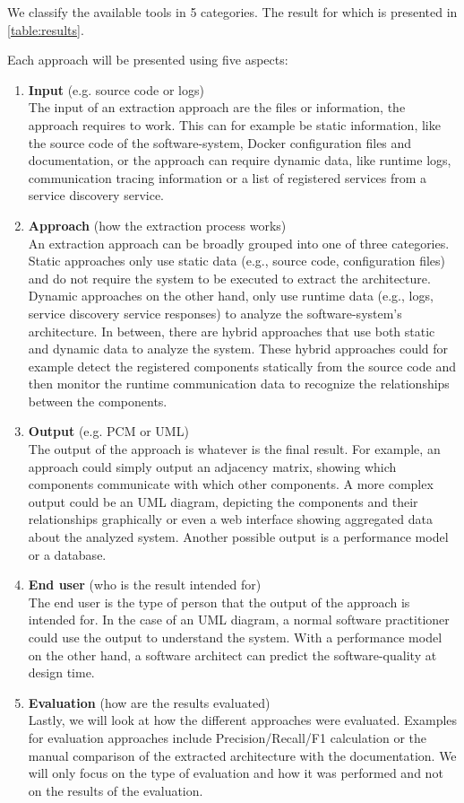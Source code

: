 We classify the available tools in 5 categories.
The result for which is presented in \autoref{table:results}.

Each approach will be presented using five aspects:
\begin{enumerate}
	\item \textbf{Input} (e.g. source code or logs) \\
		  The input of an extraction approach are the files or information, the approach requires to work.
		  This can for example be static information, like the source code of the software-system, Docker configuration files and documentation, or the approach can require dynamic data, like runtime logs, communication tracing information or a list of registered services from a service discovery service.
	\item \textbf{Approach} (how the extraction process works) \\
	      An extraction approach can be broadly grouped into one of three categories.
	      Static approaches only use static data (e.g., source code, configuration files) and do not require the system to be executed to extract the architecture.
	      Dynamic approaches on the other hand, only use runtime data (e.g., logs, service discovery service responses) to analyze the software-system's architecture.
	      In between, there are hybrid approaches that use both static and dynamic data to analyze the system. These hybrid approaches could for example detect the registered components statically from the source code and then monitor the runtime communication data to recognize the relationships between the components.
	\item \textbf{Output} (e.g. PCM or UML) \\
	      The output of the approach is whatever is the final result.
	      For example, an approach could simply output an adjacency matrix, showing which components communicate with which other components.
	      A more complex output could be an UML diagram, depicting the components and their relationships graphically or even a web interface showing aggregated data about the analyzed system.
	      Another possible output is a performance model or a database.
	\item \textbf{End user} (who is the result intended for) \\
		  The end user is the type of person that the output of the approach is intended for.
		  In the case of an UML diagram, a normal software practitioner could use the output to understand the system.
  		  With a performance model on the other hand, a software architect can predict the software-quality at design time.
	\item \textbf{Evaluation} (how are the results evaluated) \\
		  Lastly, we will look at how the different approaches were evaluated.
		  Examples for evaluation approaches include Precision/Recall/F1 calculation or the manual comparison of the extracted architecture with the documentation.
		  We will only focus on the type of evaluation and how it was performed and not on the results of the evaluation.
\end{enumerate}


